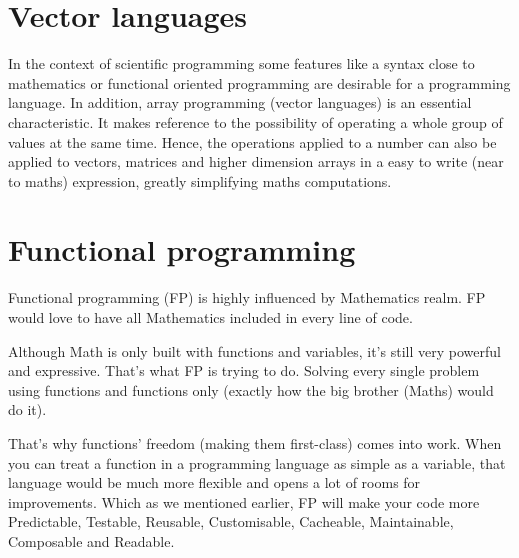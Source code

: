  

 
 
 
 
 
 
\section{Vector languages}
 
 
In the context of scientific programming some features like a syntax close to mathematics or
functional oriented programming are desirable for a programming language. 
In addition, array programming (vector languages) is an essential characteristic. 
It makes reference to the possibility of operating a whole group of values at the same time.
Hence, the operations applied to a number can also be applied to vectors, matrices and higher dimension arrays
in a easy to write (near to maths) expression, greatly simplifying maths computations.
 
 
 
 
 
 
\section{Functional programming} \label{sec:fpro}
 
Functional programming (FP) is highly influenced by Mathematics realm. 
FP would love to have all Mathematics included in every line of code.
 
Although Math is only built with functions and variables, it’s still very powerful and expressive. 
That’s what FP is trying to do. 
Solving every single problem using functions and functions only (exactly how the big brother (Maths) would do it).
 
That’s why functions’ freedom (making them first-class) comes into work. 
When you can treat a function in a programming language as simple as a variable, that language would be much more flexible and opens a lot of rooms for improvements. 
Which as we mentioned earlier, FP will make your code more Predictable, Testable, Reusable, Customisable, Cacheable, Maintainable, Composable and Readable.
 
